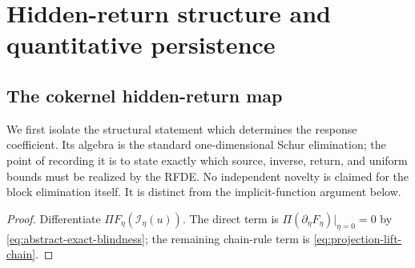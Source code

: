 \section{Hidden-return structure and quantitative persistence}
\label{sec:abstract-response}

\subsection{The cokernel hidden-return map}

We first isolate the structural statement which determines the response
coefficient.  Its algebra is the standard one-dimensional Schur elimination;
the point of recording it is to state exactly which source, inverse, return,
and uniform bounds must be realized by the RFDE.  No independent novelty is
claimed for the block elimination itself.  It is distinct from the
implicit-function argument below.


\begin{proof}
Differentiate \(\Pi F_\eta(\mathcal I_\eta(u))\).  The direct term is
\(\Pi(\partial_\eta F_\eta)|_{\eta=0}=0\) by
\cref{eq:abstract-exact-blindness}; the remaining chain-rule term is
\cref{eq:projection-lift-chain}.
\end{proof}

